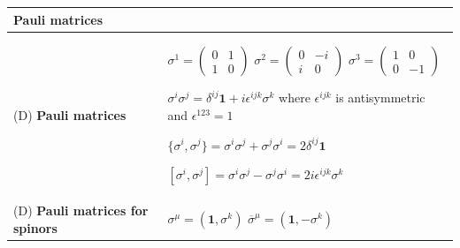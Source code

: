 \documentclass[11pt,amsmath,amssymb,latexsym]{article}
\newcommand{\toshTableBegin} 			{\begin{tabular}{|p{5cm}|p{11cm}|}}
\newcommand{\toshTableEnd} 				{\hline \end{tabular}}
\newcommand{\toshTableTitle}[1] 	{\hline \multicolumn{2}{|l|}{{\bf{#1}}}\\ \hline}
\newcommand{\toshDefinition}[2]		{\hline (D) {\bf{#1}} & {#2} \\}
\newcommand{\toshIdentity}			{{\mathbf{1}}}
\begin{document}
\toshTableBegin
\toshTableTitle{Pauli matrices}
\toshDefinition{Pauli matrices}{
\quad 
$\sigma^1 = \left( \begin{array}{cc} 0 & 1 \\ 1 & 0 \end{array}\right)$\quad
$\sigma^2 = \left( \begin{array}{cc} 0 & -i \\ i &  0 \end{array}\right)$\quad
$\sigma^3 = \left( \begin{array}{cc} 1 & 0 \\ 0 & -1 \end{array}\right)$

\bigskip

\quad $\sigma^i \sigma^j = \delta^{i j} \toshIdentity + i \epsilon^{i j k}\sigma^k$ where $\epsilon^{i j k}$ is antisymmetric and $\epsilon^{1 2 3} = 1$

\bigskip

\quad $\{\sigma^i,\sigma^j\} = \sigma^i \sigma^j + \sigma^j \sigma^i = 2 \delta^{i j}\toshIdentity$

\bigskip

\quad $[\sigma^i,\sigma^j ]  =  \sigma^i \sigma^j - \sigma^j \sigma^i = 2  i \epsilon^{i j k}\sigma^k$
}
\toshDefinition{Pauli matrices for spinors}{

\quad $\displaystyle \sigma^\mu = \left(\toshIdentity,\sigma^k\right)$ \quad \quad $\overline{\sigma}^\mu = \left(\toshIdentity, - \sigma^k\right)$ 
}
\toshTableEnd
\bigskip

\end{document}
